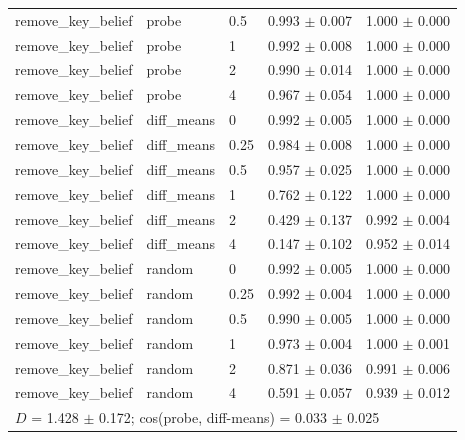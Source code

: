 \begin{tabular}{lllcc}
remove\_key\_belief & probe & 0.5 & 0.993 $\pm$ 0.007 & 1.000 $\pm$ 0.000 \\
remove\_key\_belief & probe & 1 & 0.992 $\pm$ 0.008 & 1.000 $\pm$ 0.000 \\
remove\_key\_belief & probe & 2 & 0.990 $\pm$ 0.014 & 1.000 $\pm$ 0.000 \\
remove\_key\_belief & probe & 4 & 0.967 $\pm$ 0.054 & 1.000 $\pm$ 0.000 \\
remove\_key\_belief & diff\_means & 0 & 0.992 $\pm$ 0.005 & 1.000 $\pm$ 0.000 \\
remove\_key\_belief & diff\_means & 0.25 & 0.984 $\pm$ 0.008 & 1.000 $\pm$ 0.000 \\
remove\_key\_belief & diff\_means & 0.5 & 0.957 $\pm$ 0.025 & 1.000 $\pm$ 0.000 \\
remove\_key\_belief & diff\_means & 1 & 0.762 $\pm$ 0.122 & 1.000 $\pm$ 0.000 \\
remove\_key\_belief & diff\_means & 2 & 0.429 $\pm$ 0.137 & 0.992 $\pm$ 0.004 \\
remove\_key\_belief & diff\_means & 4 & 0.147 $\pm$ 0.102 & 0.952 $\pm$ 0.014 \\
remove\_key\_belief & random & 0 & 0.992 $\pm$ 0.005 & 1.000 $\pm$ 0.000 \\
remove\_key\_belief & random & 0.25 & 0.992 $\pm$ 0.004 & 1.000 $\pm$ 0.000 \\
remove\_key\_belief & random & 0.5 & 0.990 $\pm$ 0.005 & 1.000 $\pm$ 0.000 \\
remove\_key\_belief & random & 1 & 0.973 $\pm$ 0.004 & 1.000 $\pm$ 0.001 \\
remove\_key\_belief & random & 2 & 0.871 $\pm$ 0.036 & 0.991 $\pm$ 0.006 \\
remove\_key\_belief & random & 4 & 0.591 $\pm$ 0.057 & 0.939 $\pm$ 0.012 \\
\midrule
\multicolumn{5}{l}{$D$ = 1.428 $\pm$ 0.172; cos(probe, diff-means) = 0.033 $\pm$ 0.025} \\
\bottomrule
\end{tabular}
